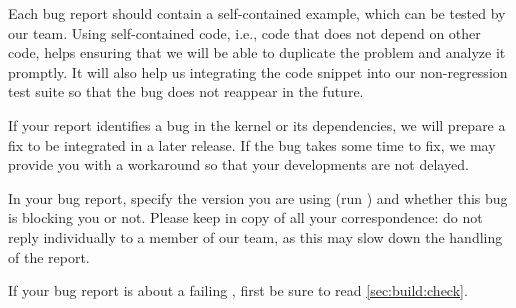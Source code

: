 Each bug report should contain a self-contained example, which can be tested
by our team. Using self-contained code, i.e., code that does not depend on
other code, helps ensuring that we will be able to duplicate the problem and
analyze it promptly. It will also help us integrating the code snippet into
our non-regression test suite so that the bug does not reappear in the
future.

If your report identifies a bug in the \urbi kernel or its dependencies, we
will prepare a fix to be integrated in a later release. If the bug takes
some time to fix, we may provide you with a workaround so that your
developments are not delayed.

In your bug report, specify the \urbi version you are using (run ) and whether this bug is blocking you or not.  Please keep
 in copy of all your correspondence: do
not reply individually to a member of our team, as this may slow down the
handling of the report.

If your bug report is about a failing , first be sure to
read \autoref{sec:build:check}.

\ifx\ifHtml\undefined\else
  \let\subsubsection\subsubsectionSave
\fi


